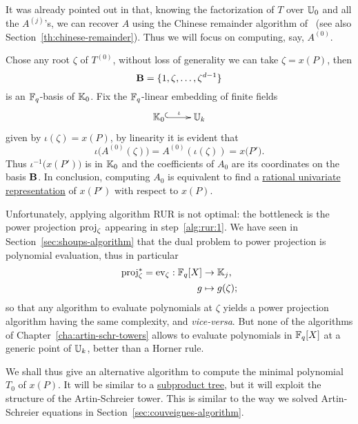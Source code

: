 It was already pointed out in \cite[$\S$2.3]{couveignes96} that,
knowing the factorization of $T$ over $\mathbb{U}_0$ and all the $A^{(j)}$'s,
we can recover $A$ using the Chinese remainder algorithm
of~\cite[$\S10$]{vzGG} (see also
Section~\ref{th:chinese-remainder}). Thus we will focus on computing,
say, $A^{(0)}$.

Chose any root $\zeta$ of $T^{(0)}$, without loss of generality we
can take $\zeta=x(P)$, then
\begin{equation}
  \label{eq:188}
  \mathbf{B}=\{1,\zeta,\ldots,\zeta^{d-1}\}  
\end{equation}
is an $\mathbb{F}_q$-basis of $\mathbb{K}_0$.  Fix the $\mathbb{F}_q$-linear embedding of
finite fields
\begin{equation}
  \label{eq:embed}
  \xymatrix{
    \K_0 \ar@{^{(}->}[r]^-\iota & \U_k
  }
\end{equation}
given by $\iota(\zeta) = x(P)$, by linearity it is evident that
\begin{equation}
  \iota\bigl(A^{(0)}(\zeta)\bigr) = A^{(0)}\left(\iota(\zeta)\right)=x\bigl(P'\bigr)
  \text{.}
\end{equation}
Thus $\iota^{-1}\bigl(x(P')\bigr)$ is in $\mathbb{K}_0$ and the coefficients
of $A_0$ are its coordinates on the basis $\mathbf{B}$. In conclusion,
computing $A_0$ is equivalent to find a \hyperref[eq:22]{rational
  univariate representation} of $x(P')$ with respect to $x(P)$.

Unfortunately, applying algorithm RUR is not optimal: the bottleneck
is the power projection $\operatorname{proj}_\zeta$ appearing in
step~\ref{alg:rur:1}. We have seen in
Section~\ref{sec:shoups-algorithm} that the dual problem to power
projection is polynomial evaluation, thus in particular
\begin{equation}
  \label{eq:189}
  \begin{aligned}
    \operatorname{proj}_\zeta^\ast = \operatorname{ev}_\zeta : \mathbb{F}_q[X] &\rightarrow \mathbb{K}_j\text{,}\\
    g &\mapsto g(\zeta)\text{;}
  \end{aligned}
\end{equation}
so that any algorithm to evaluate polynomials at $\zeta$ yields a
power projection algorithm having the same complexity, and
\emph{vice-versa}. But none of the algorithms of
Chapter~\ref{cha:artin-schr-towers} allows to evaluate polynomials in
$\mathbb{F}_q[X]$ at a generic point of $\mathbb{U}_k$, better than a Horner rule.

We shall thus give an alternative algorithm to compute the minimal
polynomial $T_0$ of $x(P)$. It will be similar to a
\hyperref[sec:chin-rema-algor]{subproduct tree}, but it will exploit
the structure of the Artin-Schreier tower. This is similar to the way
we solved Artin-Schreier equations in
Section~\ref{sec:couveignes-algorithm}.



